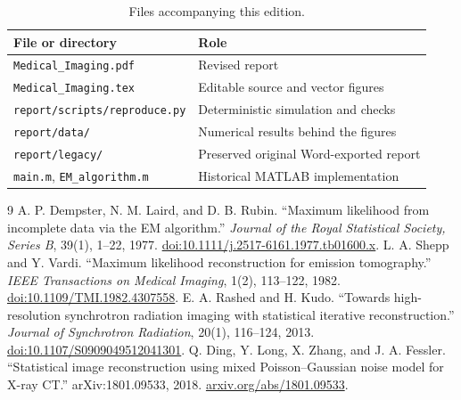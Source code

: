 \documentclass[11pt,a4paper]{article}
\begin{document}
\begin{table}[H]\small
\caption{Files accompanying this edition.}
\begin{tabularx}{\linewidth}{@{}lX@{}}\toprule
File or directory & Role\\\midrule
\texttt{Medical\_Imaging.pdf} & Revised report\\
\texttt{Medical\_Imaging.tex} & Editable source and vector figures\\
\texttt{report/scripts/reproduce.py} & Deterministic simulation and checks\\
\texttt{report/data/} & Numerical results behind the figures\\
\texttt{report/legacy/} & Preserved original Word-exported report\\
\texttt{main.m}, \texttt{EM\_algorithm.m} & Historical MATLAB implementation\\\bottomrule
\end{tabularx}
\end{table}

\begingroup\small\raggedright
\renewcommand{\refname}{References}
\begin{thebibliography}{9}
 A. P. Dempster, N. M. Laird, and D. B. Rubin.
``Maximum likelihood from incomplete data via the EM algorithm.''
\emph{Journal of the Royal Statistical Society, Series B}, 39(1), 1--22, 1977.
\href{https://doi.org/10.1111/j.2517-6161.1977.tb01600.x}{doi:10.1111/j.2517-6161.1977.tb01600.x}.
 L. A. Shepp and Y. Vardi.
``Maximum likelihood reconstruction for emission tomography.''
\emph{IEEE Transactions on Medical Imaging}, 1(2), 113--122, 1982.
\href{https://doi.org/10.1109/TMI.1982.4307558}{doi:10.1109/TMI.1982.4307558}.
 E. A. Rashed and H. Kudo.
``Towards high-resolution synchrotron radiation imaging with statistical iterative reconstruction.''
\emph{Journal of Synchrotron Radiation}, 20(1), 116--124, 2013.
\href{https://doi.org/10.1107/S0909049512041301}{doi:10.1107/S0909049512041301}.
 Q. Ding, Y. Long, X. Zhang, and J. A. Fessler.
``Statistical image reconstruction using mixed Poisson--Gaussian noise model for X-ray CT.''
arXiv:1801.09533, 2018.
\href{https://arxiv.org/abs/1801.09533}{arxiv.org/abs/1801.09533}.
\end{thebibliography}
\endgroup
\end{document}
